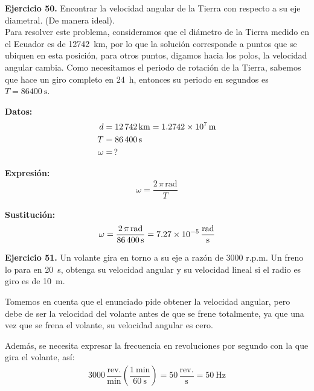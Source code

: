 \documentclass[14pt]{extarticle}
\begin{document}
\vspace*{0.3cm}
\textbf{Ejercicio 50. } Encontrar la velocidad angular de la Tierra con respecto a su eje diametral. (De manera ideal).
\\[0.5em]
Para resolver este problema, consideramos que el diámetro de la Tierra medido en el Ecuador es de \SI{12742}{\kilo\meter}, por lo que la solución corresponde a puntos que se ubiquen en esta posición, para otros puntos, digamos hacia los polos, la velocidad angular cambia. Como necesitamos el periodo de rotación de la Tierra, sabemos que hace un giro completo en \SI{24}{\hour}, entonces su periodo en segundos es $T = \SI{86400}{\second}$.

\vspace*{0.3cm}
\begin{minipage}[t]{0.4\linewidth}
\textbf{Datos:}
\begin{align*}
d &= \SI{12742}{\kilo\meter} = \SI{1.2742d7}{\meter} \\
T &= \SI{86400}{\second} \\
\omega &= \, ?
\end{align*}
\end{minipage}
\begin{minipage}[t]{0.4\linewidth}
\textbf{Expresión:}
\begin{align*}
\omega = \dfrac{2 \, \pi \, \unit{\radian}}{T}
\end{align*}
\end{minipage}

\vspace{0.3cm}
\textbf{Sustitución:}
\begin{align*}
\omega = \dfrac{2 \, \pi \, \unit{\radian}}{\SI{86400}{\second}} = \SI[per-mode=fraction]{7.27d-5}{\radian\per\second}
\end{align*}

\vspace*{0.3cm}
\textbf{Ejercicio 51. } Un volante gira en torno a su eje a razón de \num{3000} r.p.m. Un freno lo para en
\SI{20}{\second}, obtenga su velocidad angular y su velocidad lineal si el radio es giro es de \SI{10}{\meter}.

\vspace*{0.3cm}
Tomemos en cuenta que el enunciado pide obtener la velocidad angular, pero debe de ser la velocidad del volante antes de que se frene totalmente, ya que una vez que se frena el volante, su velocidad angular es cero.

Además, se necesita expresar la frecuencia en revoluciones por segundo con la que gira el volante, así:
\begin{align*}
\num{3000} \, \dfrac{\text{rev.}}{\unit{\minute}} \left( \dfrac{\SI{1}{\minute}}{\SI{60}{\second}} \right) = \unit{50} \, \dfrac{\text{rev.}}{\unit{\second}} = \SI{50}{\hertz}
\end{align*}
\end{document}

